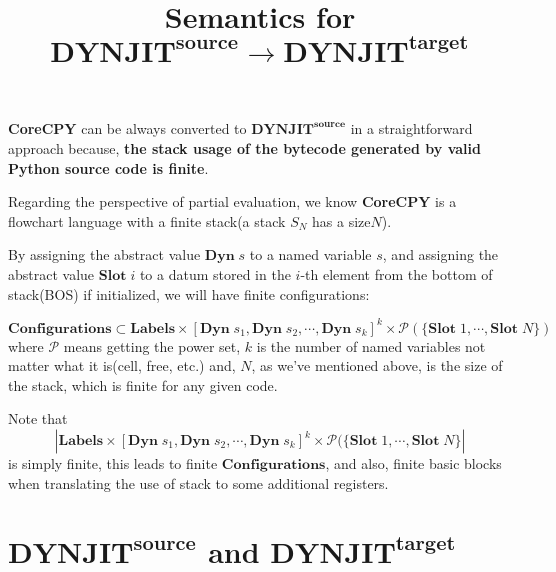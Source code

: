 \documentclass[12pt, a4paper]{report}
\title{Semantics for $\mathbf{DYNJIT}^\mathbf{source} \rightarrow \mathbf{DYNJIT}^\mathbf{target}$}
\begin{document}
\maketitle

\textbf{CoreCPY} can be always converted to $\mathbf{DYNJIT}^\mathbf{source}$
in a straightforward approach because,
\textbf{the stack usage of the bytecode generated by valid Python source code is finite}.

Regarding the perspective of partial evaluation,
we know \textbf{CoreCPY} is a flowchart language with a finite stack(a stack $S_N$ has a size$N$).

By assigning the abstract value $\mathbf{Dyn}\; s$ to a named variable $s$,
and assigning the abstract value $\mathbf{Slot}\; i$ to a datum stored in the $i$-th element from the bottom of stack(BOS) if initialized,
we will have finite configurations:

$$ \mathbf{Configurations} \subset \mathbf{Labels} \times 
\left[\mathbf{Dyn}\; s_1, \mathbf{Dyn}\; s_2, \cdots, \mathbf{Dyn}\; s_k \right]^k
\times \mathcal {P}(\{\mathbf{Slot}\; 1, \cdots, \mathbf {Slot}\; N \})
$$
where 
$\mathcal {P}$ means getting the power set, $k$ is the number of named variables not matter what it is(cell, free, etc.) and,
$N$, as we've mentioned above, is the size of the stack, which is finite for any given code.

Note that
$$ \left| \mathbf{Labels} \times 
\left[\mathbf{Dyn}\; s_1, \mathbf{Dyn}\; s_2, \cdots, \mathbf{Dyn}\; s_k \right]^k
\times \mathcal {P}(\{\mathbf{Slot}\; 1, \cdots, \mathbf {Slot}\; N \} \right| $$ is simply finite,
this leads to finite $\mathbf{Configurations}$, and also, finite basic blocks
when translating the use of stack to some additional registers.

\newpage

\section*{
    $\mathbf{DYNJIT}^{\mathbf{source}}$ 
    and 
    $\mathbf{DYNJIT}^{\mathbf{target}}$
}
\end{document}
